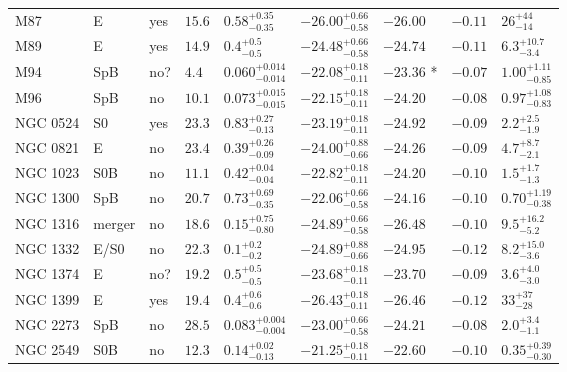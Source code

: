 \begin{table*}
\begin{center}
\begin{tabular}{lllllllll}
M87  &  E  &  yes   &  $15.6$  &  $0.58_{-0.35}^{+0.35}$   &  $-26.00_{-0.58}^{+0.66}$   &  $-26.00$   &  $-0.11$  &  $26_{-14}^{+44}$   \\ 
M89  &  E  &  yes   &  $14.9$  &  $0.4_{-0.5}^{+0.5}$   &  $-24.48_{-0.58}^{+0.66}$   &  $-24.74$   &  $-0.11$  &  $6.3_{-3.4}^{+10.7}$   \\ 
M94  &  SpB  &  no?  &  $4.4$  &  $0.060_{-0.014}^{+0.014}$   &  $-22.08_{-0.11}^{+0.18}$   &  $-23.36$  *  &  $-0.07$  &  $1.00_{-0.85}^{+1.11}$   \\ 
M96  &  SpB  &  no   &  $10.1$  &  $0.073_{-0.015}^{+0.015}$   &  $-22.15_{-0.11}^{+0.18}$   &  $-24.20$   &  $-0.08$  &  $0.97_{-0.83}^{+1.08}$   \\ 
NGC 0524  &  S0  &  yes   &  $23.3$  &  $0.83_{-0.13}^{+0.27}$   &  $-23.19_{-0.11}^{+0.18}$   &  $-24.92$   &  $-0.09$  &  $2.2_{-1.9}^{+2.5}$   \\ 
NGC 0821  &  E  &  no   &  $23.4$  &  $0.39_{-0.09}^{+0.26}$   &  $-24.00_{-0.66}^{+0.88}$   &  $-24.26$   &  $-0.09$  &  $4.7_{-2.1}^{+8.7}$   \\ 
NGC 1023  &  S0B  &  no   &  $11.1$  &  $0.42_{-0.04}^{+0.04}$   &  $-22.82_{-0.11}^{+0.18}$   &  $-24.20$   &  $-0.10$  &  $1.5_{-1.3}^{+1.7}$   \\ 
NGC 1300  &  SpB  &  no   &  $20.7$  &  $0.73_{-0.35}^{+0.69}$   &  $-22.06_{-0.58}^{+0.66}$   &  $-24.16$   &  $-0.10$  &  $0.70_{-0.38}^{+1.19}$   \\ 
NGC 1316  &  merger  &  no   &  $18.6$  &  $0.15_{-0.80}^{+0.75}$   &  $-24.89_{-0.58}^{+0.66}$   &  $-26.48$   &  $-0.10$  &  $9.5_{-5.2}^{+16.2}$   \\ 
NGC 1332  &  E/S0  &  no   &  $22.3$  &  $0.1_{-0.2}^{+0.2}$   &  $-24.89_{-0.66}^{+0.88}$   &  $-24.95$   &  $-0.12$  &  $8.2_{-3.6}^{+15.0}$   \\ 
NGC 1374  &  E  &  no?  &  $19.2$  &  $0.5_{-0.5}^{+0.5}$   &  $-23.68_{-0.11}^{+0.18}$   &  $-23.70$   &  $-0.09$  &  $3.6_{-3.0}^{+4.0}$   \\ 
NGC 1399  &  E  &  yes   &  $19.4$  &  $0.4_{-0.6}^{+0.6}$   &  $-26.43_{-0.11}^{+0.18}$   &  $-26.46$   &  $-0.12$  &  $33_{-28}^{+37}$   \\ 
NGC 2273  &  SpB  &  no   &  $28.5$  &  $0.083_{-0.004}^{+0.004}$   &  $-23.00_{-0.58}^{+0.66}$   &  $-24.21$   &  $-0.08$  &  $2.0_{-1.1}^{+3.4}$   \\ 
NGC 2549  &  S0B  &  no   &  $12.3$  &  $0.14_{-0.13}^{+0.02}$   &  $-21.25_{-0.11}^{+0.18}$   &  $-22.60$   &  $-0.10$  &  $0.35_{-0.30}^{+0.39}$   \\ 

\end{tabular}
\end{center}
\end{table*}
